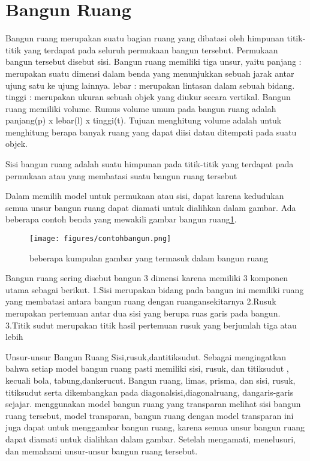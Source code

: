 	
\section{Bangun Ruang}
Bangun ruang merupakan suatu bagian ruang yang dibatasi oleh himpunan titik-titik yang terdapat pada seluruh permukaan bangun tersebut. 
Permukaan bangun tersebut disebut sisi. Bangun ruang memiliki tiga unsur, yaitu 
panjang : merupakan suatu dimensi dalam benda yang menunjukkan sebuah jarak antar ujung satu ke ujung lainnya.
lebar   : merupakan lintasan dalam sebuah bidang.
tinggi  : merupakan ukuran sebuah objek yang diukur secara vertikal.
Bangun ruang memiliki volume. Rumus volume umum pada bangun ruang adalah panjang(p) x lebar(l) x tinggi(t).
Tujuan menghitung volume adalah untuk menghitung berapa banyak ruang yang dapat diisi datau ditempati pada suatu objek.

Sisi bangun ruang adalah suatu himpunan pada titik-titik yang terdapat pada permukaan atau yang membatasi suatu bangun ruang tersebut \cite{umami2013eksperimentasi}

Dalam memilih model untuk permukaan atau sisi, dapat karena kedudukan semua unsur bangun ruang dapat diamati untuk dialihkan dalam gambar\cite{suharjana2008mengenal}. 
Ada beberapa contoh benda yang mewakili gambar bangun ruang\ref{contohbangun}.
\begin{figure}[ht]
    \centerline{\texttt{[image: figures/contohbangun.png]}}
    \caption{beberapa kumpulan gambar yang termasuk dalam bangun ruang}
    \label{contohbangun}
    \end{figure}
 
Bangun ruang sering  disebut bangun 3 dimensi karena memiliki 3 komponen utama sebagai berikut.
1.Sisi  merupakan bidang pada bangun ini memiliki ruang yang membatasi antara bangun ruang dengan ruangansekitarnya 
2.Rusuk merupakan pertemuan antar dua sisi yang berupa ruas garis pada bangun.
3.Titik sudut merupakan titik hasil pertemuan rusuk yang berjumlah tiga atau lebih

Unsur-unsur Bangun Ruang Sisi,rusuk,dantitiksudut. Sebagai mengingatkan bahwa setiap model bangun ruang pasti memiliki sisi, rusuk, dan titiksudut , kecuali bola, tabung,dankerucut.
Bangun ruang, limas, prisma, dan sisi, rusuk, titiksudut serta dikembangkan pada diagonalsisi,diagonalruang, dangaris-garis sejajar.
menggunakan model bangun ruang yang transparan  melihat sisi bangun ruang tersebut, model transparan, bangun ruang dengan model transparan ini juga dapat untuk menggambar bangun ruang, karena semua unsur bangun ruang dapat diamati untuk dialihkan dalam gambar. Setelah mengamati, 
menelusuri, dan memahami unsur-unsur bangun ruang tersebut.

